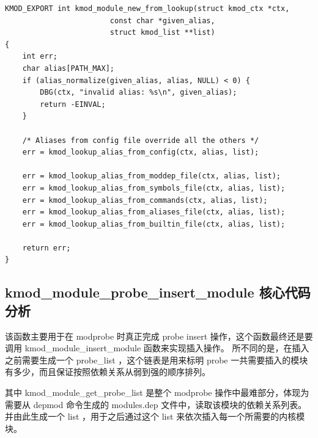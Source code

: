 {\begin{shaded}\begin{verbatim}
KMOD_EXPORT int kmod_module_new_from_lookup(struct kmod_ctx *ctx,
                        const char *given_alias,
                        struct kmod_list **list)
{
    int err;
    char alias[PATH_MAX];
    if (alias_normalize(given_alias, alias, NULL) < 0) {
        DBG(ctx, "invalid alias: %s\n", given_alias);
        return -EINVAL;
    }

    /* Aliases from config file override all the others */
    err = kmod_lookup_alias_from_config(ctx, alias, list);

    err = kmod_lookup_alias_from_moddep_file(ctx, alias, list);
    err = kmod_lookup_alias_from_symbols_file(ctx, alias, list);
    err = kmod_lookup_alias_from_commands(ctx, alias, list);
    err = kmod_lookup_alias_from_aliases_file(ctx, alias, list);
    err = kmod_lookup_alias_from_builtin_file(ctx, alias, list);

    return err;
}
\end{verbatim}\end{shaded}}
\subsection{kmod\_module\_probe\_insert\_module 核心代码分析}

该函数主要用于在 modprobe 时真正完成 probe insert
操作，这个函数最终还是要调用 kmod\_module\_insert\_module
函数来实现插入操作。 所不同的是，在插入之前需要生成一个 probe\_list
，这个链表是用来标明 probe
一共需要插入的模块有多少，而且保证按照依赖关系从弱到强的顺序排列。

其中 kmod\_module\_get\_probe\_list 是整个 modprobe
操作中最难部分，体现为需要从 depmod 命令生成的 modules.dep
文件中，读取该模块的依赖关系列表。 并由此生成一个 list ，用于之后通过这个
list 来依次插入每一个所需要的内核模块。

